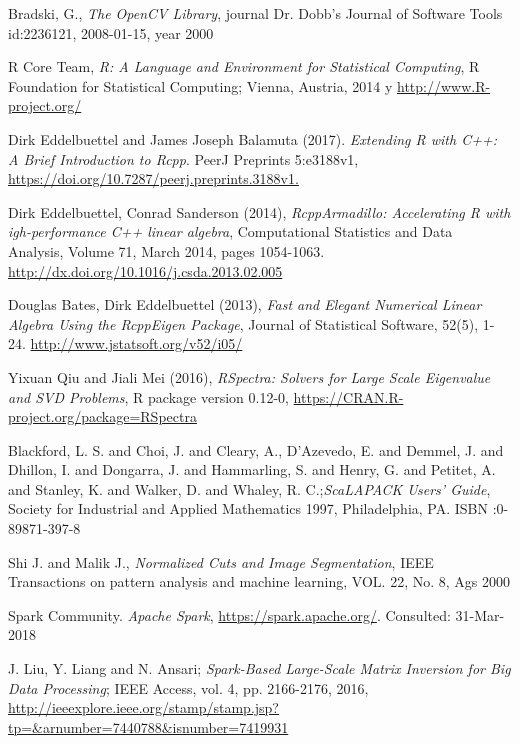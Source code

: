 \documentclass[conference]{IEEEtran}
\theoremstyle{definition}
\begin{document}
\begin{thebibliography}{1}
Bradski, G., \emph{The OpenCV Library}, journal Dr. Dobb's Journal of Software Tools id:2236121, 2008-01-15, year 2000

R Core Team, \emph{R: A Language and Environment for Statistical Computing}, R Foundation for Statistical Computing; Vienna, Austria, 2014 y  \url {http://www.R-project.org/}

Dirk Eddelbuettel and James Joseph Balamuta (2017). \emph{Extending R with C++: A Brief Introduction to Rcpp}. PeerJ Preprints 5:e3188v1, \url{https://doi.org/10.7287/peerj.preprints.3188v1.}

Dirk Eddelbuettel, Conrad Sanderson (2014), \emph{RcppArmadillo: Accelerating R with igh-performance C++ linear algebra}, Computational Statistics and Data Analysis, Volume 71, March 2014, pages 1054-1063. \url{
  http://dx.doi.org/10.1016/j.csda.2013.02.005}

Douglas Bates, Dirk Eddelbuettel (2013), \emph{Fast and Elegant Numerical Linear Algebra Using the RcppEigen Package}, Journal of Statistical Software, 52(5), 1-24. \url{http://www.jstatsoft.org/v52/i05/}

Yixuan Qiu and Jiali Mei (2016), \emph{RSpectra: Solvers for Large Scale Eigenvalue and SVD Problems}, R package version 0.12-0, \url{https://CRAN.R-project.org/package=RSpectra}

Blackford, L. S. and Choi, J. and Cleary, A., D'Azevedo, E. and Demmel, J. and Dhillon, I. and Dongarra, J. and Hammarling, S. and Henry, G. and Petitet, A. and Stanley, K. and Walker, D. and Whaley, R. C.;\emph{ScaLAPACK Users' Guide}, Society for Industrial and Applied Mathematics 1997,
Philadelphia, PA. ISBN :0-89871-397-8  

Shi J. and Malik J., \emph{Normalized Cuts and Image Segmentation}, IEEE Transactions on pattern analysis and machine learning, VOL. 22, No. 8, Ags 2000

Spark Community. \emph{Apache Spark},  \url{https://spark.apache.org/}. Consulted: 31-Mar-2018

J. Liu, Y. Liang and N. Ansari; \emph{Spark-Based Large-Scale Matrix Inversion for Big Data Processing}; IEEE Access, vol. 4, pp. 2166-2176, 2016, \url{http://ieeexplore.ieee.org/stamp/stamp.jsp?tp=&arnumber=7440788&isnumber=7419931}

\end{thebibliography}
\end{document}
